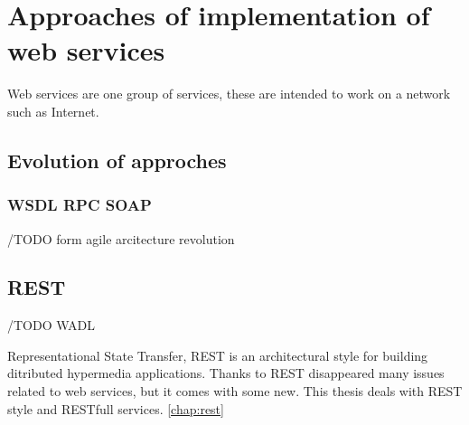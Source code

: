 \section{Approaches of implementation of web services}
Web services are one group of services, these are intended to work on a network such as Internet.

\subsection{Evolution of approches}
\subsubsection{WSDL RPC SOAP} 
/TODO form agile arcitecture revolution
 
\subsection{REST}
/TODO WADL

Representational State Transfer, REST is an architectural style for building ditributed hypermedia applications.
Thanks to REST disappeared many issues related to web services, but it comes with some new. This thesis deals with REST style and RESTfull services. \ref{chap:rest}

    

